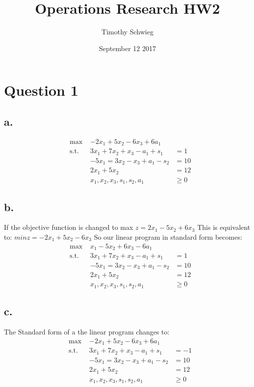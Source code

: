 \documentclass[10pt, letterpaper]{paper}
\title{ Operations Research HW2 }
\author{ Timothy Schwieg }
\date{ September 12 2017 }
\begin{document}
\maketitle

\section*{Question 1 }
\subsection*{a.}
\begin{equation*}
\begin{alignedat}{3}
&\text{max }&-2x_1 + 5x_2 - 6x_3 + 6a_1&\\
&\text{s.t. } &3x_1 + 7x_2 + x_3 - a_1 + s_1 &= 1 \\
& &-5x_1 = 3x_2 - x_3 + a_1 - s_2 &= 10\\
& &2x_1 + 5x_2 &= 12\\
& &x_1, x_2, x_3, s_1, s_2, a_1 &\geq 0
\end{alignedat}
\end{equation*}

\subsection*{b.}
If the objective function is changed to max $z = 2x_1 - 5x_2 + 6x_3$ This is equivalent to: $min z = -2x_1 + 5x_2 - 6x_3$
So our linear program in standard form becomes: 
\begin{equation*}
\begin{alignedat}{3}
&\text{max }&x_1 - 5x_2 + 6x_3 - 6a_1&\\
&\text{s.t. } &3x_1 + 7x_2 + x_3 - a_1 + s_1 &= 1 \\
& &-5x_1 = 3x_2 - x_3 + a_1 - s_2 &= 10\\
& &2x_1 + 5x_2 &= 12\\
& &x_1, x_2, x_3, s_1, s_2, a_1 &\geq 0
\end{alignedat}
\end{equation*}

\subsection*{c.}
The Standard form of a the linear program changes to:
\begin{equation*}
\begin{alignedat}{3}
&\text{max }&-2x_1 + 5x_2 - 6x_3 + 6a_1&\\
&\text{s.t. } &3x_1 + 7x_2 + x_3 - a_1 + s_1 &= -1 \\
& &-5x_1 = 3x_2 - x_3 + a_1 - s_2 &= 10\\
& &2x_1 + 5x_2 &= 12\\
& &x_1, x_2, x_3, s_1, s_2, a_1 &\geq 0
\end{alignedat}
\end{equation*}
\end{document}
